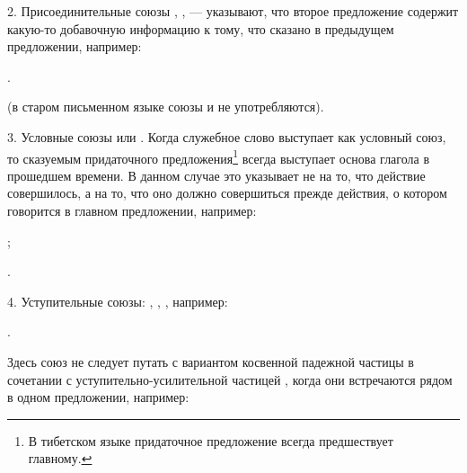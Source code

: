 2.	Присоединительные союзы , ,  --- указывают, что второе предложение содержит какую-то добавочную информацию к тому, что сказано в предыдущем предложении, например:
\begin{prfsample}
	\item {}.
\end{prfsample}
(в старом письменном языке союзы  и  не употребляются).

3. Условные союзы  или . Когда служебное слово  выступает как условный союз, то	сказуемым придаточного предложения\footnote[50]{В тибетском языке придаточное предложение всегда предшествует главному.} всегда выступает основа глагола в прошедшем времени. В данном случае это указывает не на то, что действие совершилось, а на то, что оно должно совершиться прежде действия, о котором говорится в главном предложении, например:
\begin{prfsample}
	\item {};
	\item {}.
\end{prfsample}

4.	Уступительные союзы: , , , например:
\begin{prfsample}
	\item {}.
\end{prfsample}
Здесь союз  не следует путать с вариантом косвенной падежной частицы  в сочетании с уступительно-усилительной частицей , когда они встречаются рядом в одном предложении, например:
\begin{prfsample}
	\item {}
\end{prfsample}

